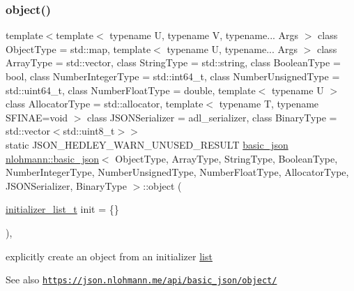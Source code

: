 \subsubsection{\texorpdfstring{object()}{object()}}
{\footnotesize\ttfamily template$<$template$<$ typename U, typename V, typename... Args $>$ class Object\+Type = std\+::map, template$<$ typename U, typename... Args $>$ class Array\+Type = std\+::vector, class String\+Type  = std\+::string, class Boolean\+Type  = bool, class Number\+Integer\+Type  = std\+::int64\+\_\+t, class Number\+Unsigned\+Type  = std\+::uint64\+\_\+t, class Number\+Float\+Type  = double, template$<$ typename U $>$ class Allocator\+Type = std\+::allocator, template$<$ typename T, typename S\+F\+I\+N\+A\+E=void $>$ class J\+S\+O\+N\+Serializer = adl\+\_\+serializer, class Binary\+Type  = std\+::vector$<$std\+::uint8\+\_\+t$>$$>$ \\
static J\+S\+O\+N\+\_\+\+H\+E\+D\+L\+E\+Y\+\_\+\+W\+A\+R\+N\+\_\+\+U\+N\+U\+S\+E\+D\+\_\+\+R\+E\+S\+U\+LT \hyperlink{classnlohmann_1_1basic__json}{basic\+\_\+json} \hyperlink{classnlohmann_1_1basic__json}{nlohmann\+::basic\+\_\+json}$<$ Object\+Type, Array\+Type, String\+Type, Boolean\+Type, Number\+Integer\+Type, Number\+Unsigned\+Type, Number\+Float\+Type, Allocator\+Type, J\+S\+O\+N\+Serializer, Binary\+Type $>$\+::object (\begin{DoxyParamCaption}\item[{\hyperlink{classnlohmann_1_1basic__json_ac569f292a070dfd2f6b69c16e746095a}{initializer\+\_\+list\+\_\+t}}]{init = {\ttfamily \{\}} }\end{DoxyParamCaption})\hspace{0.3cm}{\ttfamily [inline]}, {\ttfamily [static]}}



explicitly create an object from an initializer \hyperlink{protocollist-p}{list} 

\begin{DoxySeeAlso}{See also}
\href{https://json.nlohmann.me/api/basic_json/object/}{\tt https\+://json.\+nlohmann.\+me/api/basic\+\_\+json/object/} 
\end{DoxySeeAlso}
\mbox{\label{classnlohmann_1_1basic__json_a6d4b8df10ecc533a50823e8805f4a873}} 
